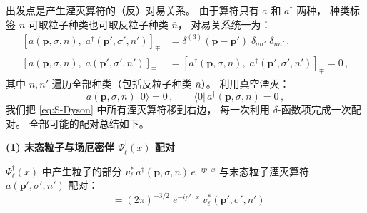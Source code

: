 出发点是产生湮灭算符的（反）对易关系。
由于算符只有 $a$ 和 $a^\dagger$ 两种，
种类标签 $n$ 可取粒子种类也可取反粒子种类 $\bar{n}$，
对易关系统一为：
\begin{subequations}\label{eq:comm-all}
\begin{align}
  [a(\boldsymbol{p},\sigma,n),\;a^\dagger(\boldsymbol{p}',\sigma',n')]_\mp
  &= \delta^{(3)}(\boldsymbol{p}-\boldsymbol{p}')\;\delta_{\sigma\sigma'}\;\delta_{nn'}\,,
  \label{eq:comm-aad}\\[4pt]
  [a(\boldsymbol{p},\sigma,n),\;a(\boldsymbol{p}',\sigma',n')]_\mp
  &= [a^\dagger(\boldsymbol{p},\sigma,n),\;a^\dagger(\boldsymbol{p}',\sigma',n')]_\mp = 0\,,
  \label{eq:comm-aa}
\end{align}
\end{subequations}
其中 $n,n'$ 遍历全部种类（包括反粒子种类 $\bar{n}$）。
利用真空湮灭：
\begin{equation}
  a(\boldsymbol{p},\sigma,n)\,|0\rangle = 0\,,\qquad
  \langle 0|\,a^\dagger(\boldsymbol{p},\sigma,n) = 0\,,
\label{eq:vacuum}
\end{equation}
我们把 \eqref{eq:S-Dyson} 中所有湮灭算符移到右边，
每一次利用 $\delta$-函数项完成一次配对。
全部可能的配对总结如下。

\bigskip\noindent
\textbf{(1) 末态粒子与场厄密伴 $\Psi_\ell^\dagger(x)$ 配对}

$\Psi_\ell^\dagger(x)$ 中产生粒子的部分
$v_\ell^*\,a^\dagger(\boldsymbol{p},\sigma,n)\,e^{-ip\cdot x}$
与末态粒子湮灭算符 $a(\boldsymbol{p}',\sigma',n')$ 配对：
\begin{equation}
  [a(\boldsymbol{p}',\sigma',n'),\;\Psi_\ell^\dagger(x)]_\mp
  = (2\pi)^{-3/2}\;e^{-ip'\cdot x}\;v_\ell^*(\boldsymbol{p}',\sigma',n')
\label{eq:pair1}
\end{equation}

\begin{center}
\end{center}

